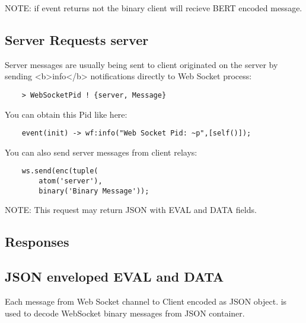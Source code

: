 NOTE: if event returns not the binary client will recieve BERT encoded message.

\newpage
\subsection{Server Requests {\bf server}}

Server messages are usually being sent to client originated on the
server by sending <b>info</b> notifications directly to Web Socket process:

\vspace{1\baselineskip}
\begin{lstlisting}
    > WebSocketPid ! {server, Message}
\end{lstlisting}
\vspace{1\baselineskip}

You can obtain this Pid like here:

\vspace{1\baselineskip}
\begin{lstlisting}
    event(init) -> wf:info("Web Socket Pid: ~p",[self()]);
\end{lstlisting}
\vspace{1\baselineskip}

You can also send server messages from client relays:

\vspace{1\baselineskip}
\begin{lstlisting}
    ws.send(enc(tuple(
        atom('server'),
        binary('Binary Message'));
\end{lstlisting}
\vspace{1\baselineskip}

NOTE: This request may return JSON with EVAL and DATA fields.

\newpage
\subsection*{Responses}

\subsection{JSON enveloped EVAL and DATA}

Each message from Web Socket channel to Client encoded as JSON object.
is used to decode WebSocket binary messages from JSON container.

